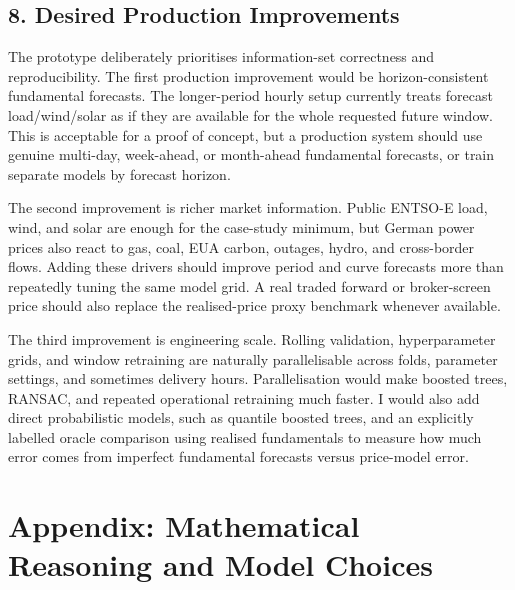 \documentclass[10pt,a4paper]{article}
\begin{document}
\subsection*{8. Desired Production Improvements}
The prototype deliberately prioritises information-set correctness and reproducibility. The first production improvement would be horizon-consistent fundamental forecasts. The longer-period hourly setup currently treats forecast load/wind/solar as if they are available for the whole requested future window. This is acceptable for a proof of concept, but a production system should use genuine multi-day, week-ahead, or month-ahead fundamental forecasts, or train separate models by forecast horizon.

The second improvement is richer market information. Public ENTSO-E load, wind, and solar are enough for the case-study minimum, but German power prices also react to gas, coal, EUA carbon, outages, hydro, and cross-border flows. Adding these drivers should improve period and curve forecasts more than repeatedly tuning the same model grid. A real traded forward or broker-screen price should also replace the realised-price proxy benchmark whenever available.

The third improvement is engineering scale. Rolling validation, hyperparameter grids, and window retraining are naturally parallelisable across folds, parameter settings, and sometimes delivery hours. Parallelisation would make boosted trees, RANSAC, and repeated operational retraining much faster. I would also add direct probabilistic models, such as quantile boosted trees, and an explicitly labelled oracle comparison using realised fundamentals to measure how much error comes from imperfect fundamental forecasts versus price-model error.

\newpage
\section*{Appendix: Mathematical Reasoning and Model Choices}
\end{document}
